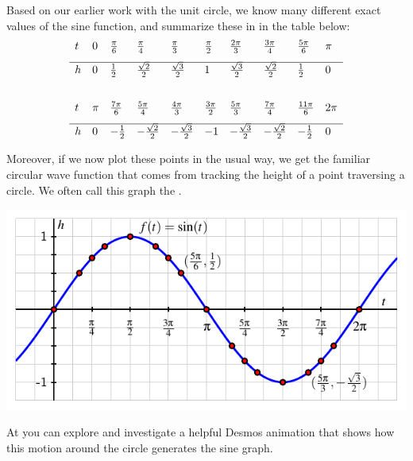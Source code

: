 \documentclass[nooutcomes]{ximera}
\begin{document}
Based on our earlier work with the unit circle, we know many different exact values of the sine function, and summarize these in in the table below:
\[
\begin{array}{llllllllll}
t&0&\frac{\pi}{6}&\frac{\pi}{4}&\frac{\pi}{3}&\frac{\pi}{2}&\frac{2\pi}{3}&\frac{3\pi}{4}&\frac{5\pi}{6}&\pi\\[8pt]
\hline \\[-3ex]
h&0&\frac{1}{2}&\frac{\sqrt{2}}{2}&\frac{\sqrt{3}}{2}&1&\frac{\sqrt{3}}{2}&\frac{\sqrt{2}}{2}&\frac{1}{2}&0\\[10pt]
&&&&&&&&&\\
t&\pi&\frac{7\pi}{6}&\frac{5\pi}{4}&\frac{4\pi}{3}&\frac{3\pi}{2}&\frac{5\pi}{3}&\frac{7\pi}{4}&\frac{11\pi}{6}&2\pi\\[8pt]
\hline\\[-3ex]
h&0&-\frac{1}{2}&-\frac{\sqrt{2}}{2}&-\frac{\sqrt{3}}{2}&-1&-\frac{\sqrt{3}}{2}&-\frac{\sqrt{2}}{2}&-\frac{1}{2}&0
\end{array}
\]

Moreover, if we now plot these points in the usual way, we get the familiar circular wave function that comes from tracking the height of a point traversing a circle.  We often call this graph the .

\begin{image}
\includegraphics{sine-definition-graph.pdf}
\end{image}

At  you can explore and investigate a helpful Desmos animation that shows how this motion around the circle generates the sine graph.
\end{document}
